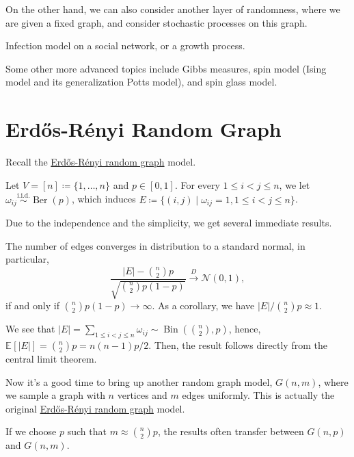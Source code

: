 On the other hand, we can also consider another layer of randomness, where we are given a fixed graph, and consider stochastic processes on this graph.

\begin{eg}
	Infection model on a social network, or a growth process.
\end{eg}

Some other more advanced topics include Gibbs measures, spin model (Ising model and its generalization Potts model), and spin glass model.

\section{Erdős-Rényi Random Graph}
Recall the \hyperref[def:Erdős-Rényi-random-graph]{Erdős-Rényi random graph} model.

\begin{prev}
	Let \(V = [n] \coloneqq \{ 1, \dots , n \} \) and \(p \in [0, 1]\). For every \(1 \leq i < j \leq n\), we let \(\omega _{ij} \overset{\text{i.i.d.} }{\sim } \operatorname{Ber}(p) \), which induces \(E \coloneqq \{ (i, j) \mid \omega _{ij} = 1, 1 \leq i < j \leq n\} \).
\end{prev}

Due to the independence and the simplicity, we get several immediate results.

\begin{claim}
	The number of edges converges in distribution to a standard normal, in particular,
	\[
		\frac{\lvert E \rvert - \binom{n}{2}p}{\sqrt{\binom{n}{2}p (1 - p)} }
		\overset{D}{\to } \mathcal{N} (0, 1),
	\]
	if and only if \(\binom{n}{2}p (1 - p) \to \infty \). As a corollary, we have \(\lvert E \rvert / \binom{n}{2}p \approx 1\).
\end{claim}
\begin{explanation}
	We see that \(\lvert E \rvert = \sum_{1 \leq i < j \leq n} \omega _{ij} \sim \operatorname{Bin}(\binom{n}{2}, p) \), hence, \(\mathbb{E}_{}[\lvert E \rvert ] = \binom{n}{2}p = n(n-1) p / 2\). Then, the result follows directly from the central limit theorem.
\end{explanation}

Now it's a good time to bring up another random graph model, \(G(n, m)\), where we sample a graph with \(n\) vertices and \(m\) edges uniformly. This is actually the original \hyperref[def:Erdős-Rényi-random-graph]{Erdős-Rényi random graph} model.

\begin{remark}
	If we choose \(p\) such that \(m \approx \binom{n}{2}p\), the results often transfer between \(G(n, p)\) and \(G(n, m)\).
\end{remark}

